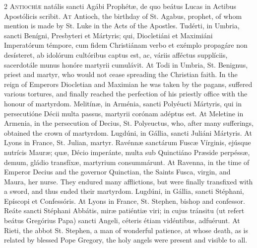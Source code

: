 \begin{paracol}{2}
\lettrine[lines=2]{A}{ntiochíæ} natális sancti Agábi Prophétæ, de quo 
 beátus Lucas in Actibus Apostólicis scribit.
\switchcolumn
{}
\lettrine[lines=2]{A}{t} Antioch, the birthday of St. Agabus, prophet, of whom mention is made by 
 St. Luke in the Acts of the Apostles.
\switchcolumn*
{}
Tudérti, in Umbria, sancti Benígni, Presbyteri et Mártyris; qui, Diocletiáni 
 et Maximiáni Imperatórum témpore, cum fidem Christiánam verbo et exémplo 
 propagáre non desísteret, ab idolórum cultóribus captus est, ac, váriis 
 afféctus supplíciis, sacerdotále munus honóre martyrii cumulávit.
\switchcolumn
{}
At Todi in Umbria, St. Benignus, priest and martyr, who would not cease 
 spreading the Christian faith. In the reign of Emperors Diocletian and 
 Maximian he was taken by the pagans, suffered various tortures, and finally 
 reached the perfection of his priestly office with the honour of martyrdom.
\switchcolumn*
{}
Melitínæ, in Arménia, sancti Polyéucti Mártyris, 
 qui in persecutióne Décii multa passus, martyrii corónam adéptus est.
\switchcolumn
{}
At Meletine in Armenia, in the persecution of Decius, St. Polyeuctus, who, 
 after many sufferings, obtained the crown of martyrdom.
\switchcolumn*
{}
Lugdúni, in Gállia, sancti Juliáni Mártyris.
\switchcolumn
{}
At Lyons in France, St. Julian, martyr.
\switchcolumn*
{}
Ravénnæ sanctárum Fuscæ Vírginis, ejúsque 
 nutrícis Mauræ; quæ, Décio imperánte, multa sub Quinctiáno Præside perpéssæ, 
 demum, gládio transfíxæ, martyrium consummárunt.
\switchcolumn
{}
At Ravenna, in the time of Emperor Decius and the governor Quinctian, the 
 Saints Fusca, virgin, and Maura, her nurse. They endured many 
 afflictions, but were finally transfixed with a sword, and thus ended their 
 martyrdom.
\switchcolumn*
{}
Lugdúni, in Gállia, sancti Stéphani, Epíscopi et Confessóris.
\switchcolumn
{}
At Lyons in France, St. Stephen, bishop and confessor.
\switchcolumn*
{}
Reáte sancti Stéphani Abbátis, miræ patiéntiæ 
 viri; in cujus tránsitu (ut refert beátus Gregórius Papa) sancti Angeli, 
 céteris étiam vidéntibus, adfuérunt.
\switchcolumn
{}
At Rieti, the abbot St. Stephen, a man of wonderful patience, at whose 
 death, as is related by blessed Pope Gregory, the holy angels were present 
 and visible to all.
\switchcolumn*
{}
\end{paracol}


